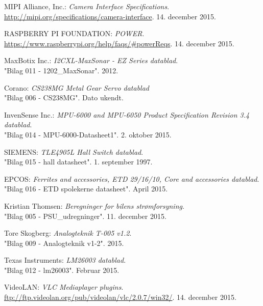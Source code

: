 \renewcommand{\bibname}{Litteraturliste}
\fancyhead[CE,CO]{}
\fancyfoot[CE,CO]{}
\begin{thebibliography}{2}

 MIPI Alliance, Inc.: \textit{Camera Interface Specifications}. \\ 
\url{http://mipi.org/specifications/camera-interface}. 14. december 2015.

 RASPBERRY PI FOUNDATION: \textit{POWER}. \\
\url{https://www.raspberrypi.org/help/faqs/#powerReqs}. 14. december 2015.

 MaxBotix Inc.: \textit{I2CXL-MaxSonar - EZ Series datablad}. \\
"Bilag 011 - 1202\_MaxSonar". 2012.

 Corano: \textit{CS238MG Metal Gear Servo datablad}\\
"Bilag 006 - CS238MG". Dato ukendt.

 InvenSense Inc.: \textit{MPU-6000 and MPU-6050 Product Specification Revision 3.4 datablad}. \\
"Bilag 014 - MPU-6000-Datasheet1". 2. oktober 2015.

 SIEMENS: \textit{TLE4905L Hall Switch datablad}. \\
"Bilag 015 - hall datasheet". 1. september 1997.

 EPCOS: \textit{Ferrites and accessories, ETD 29/16/10, Core and accessories datablad}. \\
"Bilag 016 - ETD spolekerne datasheet". April 2015.

 Kristian Thomsen: \textit{Beregninger for bilens strømforsyning}. \\
"Bilag 005 - PSU\_udregninger". 11. december 2015.

 Tore Skogberg: \textit{Analogteknik T-005 v1.2}.\\
"Bilag 009 - Analogteknik v1-2". 2015.

 Texas Instruments: \textit{LM26003 datablad}. \\
"Bilag 012 - lm26003". Februar 2015.

 VideoLAN: \textit{VLC Mediaplayer plugins}. \\
\url{ftp://ftp.videolan.org/pub/videolan/vlc/2.0.7/win32/}. 14. december 2015.


\end{thebibliography}
